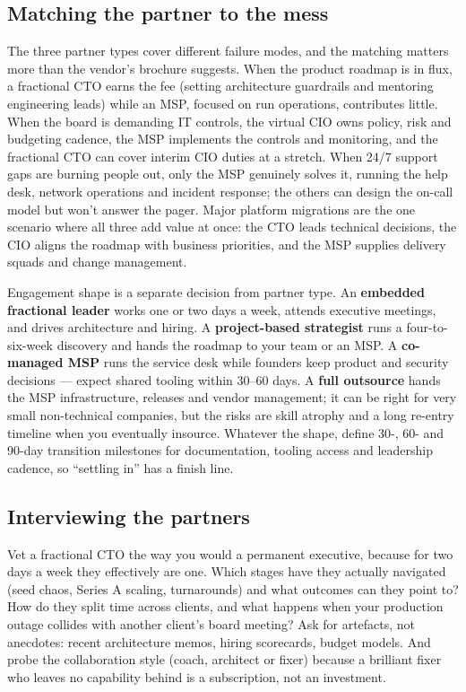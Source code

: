 \subsection{Matching the partner to the mess}


The three partner types cover different failure modes, and the matching matters more than the vendor's brochure suggests. When the product roadmap is in flux, a fractional CTO earns the fee (setting architecture guardrails and mentoring engineering leads) while an MSP, focused on run operations, contributes little. When the board is demanding IT controls, the virtual CIO owns policy, risk and budgeting cadence, the MSP implements the controls and monitoring, and the fractional CTO can cover interim CIO duties at a stretch. When 24/7 support gaps are burning people out, only the MSP genuinely solves it, running the help desk, network operations and incident response; the others can design the on-call model but won't answer the pager. Major platform migrations are the one scenario where all three add value at once: the CTO leads technical decisions, the CIO aligns the roadmap with business priorities, and the MSP supplies delivery squads and change management.


Engagement shape is a separate decision from partner type. An \textbf{embedded fractional leader} works one or two days a week, attends executive meetings, and drives architecture and hiring. A \textbf{project-based strategist} runs a four-to-six-week discovery and hands the roadmap to your team or an MSP. A \textbf{co-managed MSP} runs the service desk while founders keep product and security decisions — expect shared tooling within 30–60 days. A \textbf{full outsource} hands the MSP infrastructure, releases and vendor management; it can be right for very small non-technical companies, but the risks are skill atrophy and a long re-entry timeline when you eventually insource. Whatever the shape, define 30-, 60- and 90-day transition milestones for documentation, tooling access and leadership cadence, so ``settling in'' has a finish line.



\subsection{Interviewing the partners}


Vet a fractional CTO the way you would a permanent executive, because for two days a week they effectively are one. Which stages have they actually navigated (seed chaos, Series A scaling, turnarounds) and what outcomes can they point to? How do they split time across clients, and what happens when your production outage collides with another client's board meeting? Ask for artefacts, not anecdotes: recent architecture memos, hiring scorecards, budget models. And probe the collaboration style (coach, architect or fixer) because a brilliant fixer who leaves no capability behind is a subscription, not an investment.


